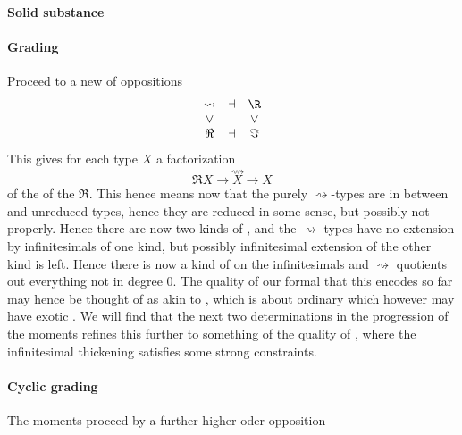 \documentclass[12pt,titlepage]{article}
\newcommand{\itexarray}[1]{\begin{matrix}#1\end{matrix}}
\theoremstyle{plain}
\theoremstyle{definition}
\theoremstyle{remark}
\begin{document}
\hypertarget{solid_substance}{}\paragraph*{{Solid substance}}\label{solid_substance}
\hypertarget{Grading}{}\paragraph*{{Grading}}\label{Grading}
Proceed to a new  of oppositions
\begin{displaymath}
\itexarray{
\rightsquigarrow &\dashv& \R
\\
\vee && \vee
\\
\Re &\dashv& \Im
}
\end{displaymath}
This gives for each type $X$ a factorization
\begin{displaymath}
\Re X \longrightarrow \stackrel{\rightsquigarrow}{X} \longrightarrow X
\end{displaymath}
of the  of the  $\Re$.
This hence means now that the purely $\rightsquigarrow$-types are in between  and unreduced types, hence they are reduced in some sense, but possibly not properly. Hence there are now two kinds of , and the $\rightsquigarrow$-types have no extension by infinitesimals of one kind, but possibly infinitesimal extension of the other kind is left.
Hence there is now a kind of  on the infinitesimals and $\rightsquigarrow$ quotients out everything not in degree 0.
The  quality of our formal  that this encodes so far may hence be thought of as akin to , which is about ordinary  which however may have exotic  . We will find that the next two determinations in the progression of the moments refines this further to something of the quality of , where the infinitesimal thickening satisfies some strong constraints.
\hypertarget{cyclic_grading}{}\paragraph*{{Cyclic grading}}\label{cyclic_grading}
The moments proceed by a further higher-oder opposition
\end{document}
